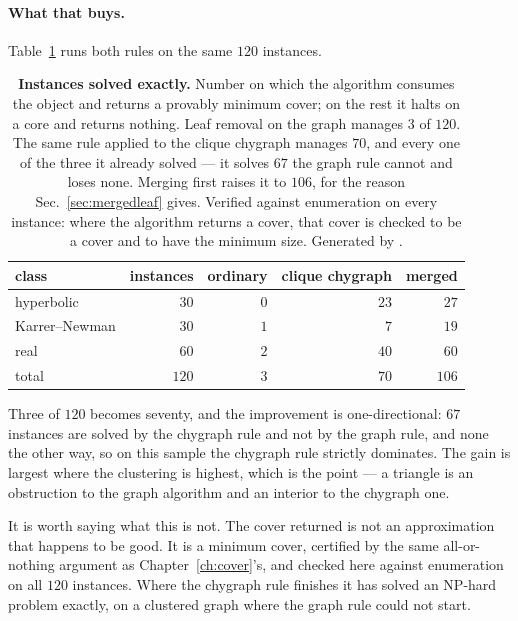 \paragraph{What that buys.} Table~\ref{tab:leafclasses} runs both rules on the
same $120$ instances.

\begin{table}[t]
\centering\small
\begin{tabular}{lrrrr}
\hline\hline
class & instances & ordinary & clique chygraph & merged\\
\hline
hyperbolic & $30$ & $0$ & $23$ & $27$\\
Karrer--Newman & $30$ & $1$ & $7$ & $19$\\
real & $60$ & $2$ & $40$ & $60$\\
\hline
total & $120$ & $3$ & $70$ & $106$\\
\hline\hline
\end{tabular}
\caption{\textbf{Instances solved exactly.} Number on which the algorithm
consumes the object and returns a provably minimum cover; on the rest it halts
on a core and returns nothing. Leaf removal on the graph manages $3$ of $120$.
The same rule applied to the clique chygraph manages $70$, and every one of the
three it already solved --- it solves $67$ the graph rule cannot and loses none.
Merging first raises it to $106$, for the reason Sec.~\ref{sec:mergedleaf}
gives. Verified against enumeration on every instance: where the algorithm
returns a cover, that cover is checked to be a cover and to have the minimum
size. Generated by .}
\label{tab:leafclasses}
\end{table}

Three of $120$ becomes seventy, and the improvement is one-directional: $67$
instances are solved by the chygraph rule and not by the graph rule, and none
the other way, so on this sample the chygraph rule strictly dominates. The gain
is largest where the clustering is highest, which is the point --- a triangle is
an obstruction to the graph algorithm and an interior to the chygraph one.

It is worth saying what this is not. The cover returned is not an approximation
that happens to be good. It is a minimum cover, certified by the same
all-or-nothing argument as Chapter~\ref{ch:cover}'s, and checked here against
enumeration on all $120$ instances. Where the chygraph rule finishes it has
solved an NP-hard problem exactly, on a clustered graph where the graph rule
could not start.


